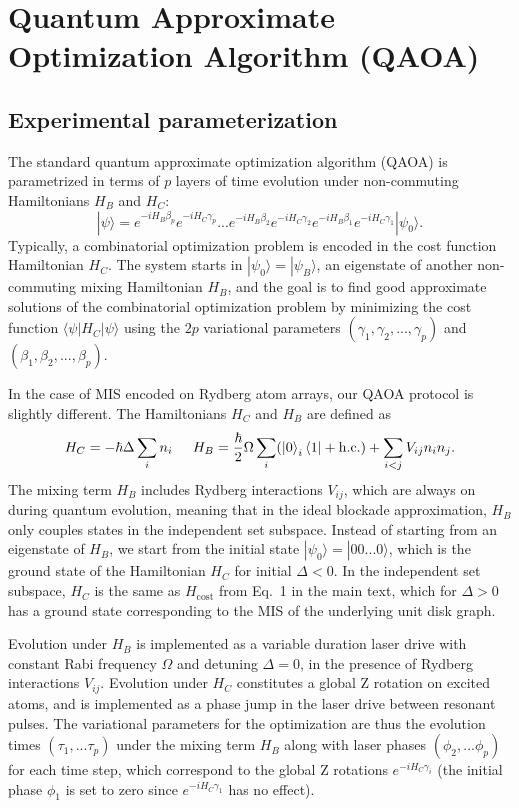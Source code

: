 \documentclass[twocolumn,amssymb,secnumarabic, prl, aps, nofootinbib]{revtex4-1}
\begin{document}
\section{Quantum Approximate Optimization Algorithm (QAOA) \label{sec:qaoa}}

\subsection{Experimental parameterization}

The standard quantum approximate optimization algorithm (QAOA) is parametrized in terms of $p$ layers of time evolution under non-commuting Hamiltonians $H_B$ and $H_C$:
\begin{equation}
	| \psi \rangle = e^{-i H_B\beta_p}e^{-i H_C \gamma_p} ... e^{-iH_B \beta_2} e^{-i H_C\gamma_2}e^{-iH_B \beta_1} e^{-i H_C\gamma_1} | \psi_0 \rangle.
\end{equation}
Typically, a combinatorial optimization problem is encoded in the cost function Hamiltonian $H_C$. The system starts in $|\psi_0\rangle = |\psi_B\rangle$, an eigenstate of another non-commuting mixing Hamiltonian $H_B$, and the goal is to find good approximate solutions of the combinatorial optimization problem by minimizing the cost function $\langle \psi |H_C|\psi \rangle$ using the $2p$ variational parameters $(\gamma_1, \gamma_2, ..., \gamma_p)$ and $(\beta_1, \beta_2, ... , \beta_p)$. 


In the case of MIS encoded on Rydberg atom arrays, our QAOA protocol is slightly different. The Hamiltonians $H_C$ and $H_B$ are defined as
\begin{equation}
	H_C = -\hbar \Delta \sum_{i} n_i\hspace{0.2in} H_B = \dfrac{\hbar}{2} \Omega \sum_{i}(\ket{0}_{i}\bra{1} + {\rm h.c.}) + \sum_{i<j}V_{ij}n_i n_j.
\end{equation}
The mixing term $H_B$ includes Rydberg interactions $V_{ij}$, which are always on during quantum evolution, meaning that in the ideal blockade approximation, $H_B$ only couples states in the independent set subspace. Instead of starting from an eigenstate of $H_B$, we start from the initial state $|\psi_0\rangle = | 00 ... 0 \rangle$, which is the ground state of the Hamiltonian $H_C$ for initial $\Delta < 0$.  In the independent set subspace, $H_C$ is the same as $H_{\text{cost}}$ from Eq.~1 in the main text, which for $\Delta > 0$ has a ground state corresponding to the MIS of the underlying unit disk graph. 

Evolution under $H_B$ is implemented as a variable duration laser drive with constant Rabi frequency $\Omega$ and detuning $\Delta = 0$, in the presence of Rydberg interactions $V_{ij}$. Evolution under $H_C$ constitutes a global Z rotation on excited atoms, and is implemented as a phase jump in the laser drive between resonant pulses. The variational parameters for the optimization are thus the evolution times $(\tau_1, ... \tau_p)$ under the mixing term $H_B$ %
along with laser phases $(\phi_2, ... \phi_p)$ for each time step, which correspond to the global Z rotations $e^{-iH_C \gamma_i}$ (the initial phase $\phi_1$ is set to zero since $e^{-iH_C \gamma_1}$ has no effect). 
\end{document}
